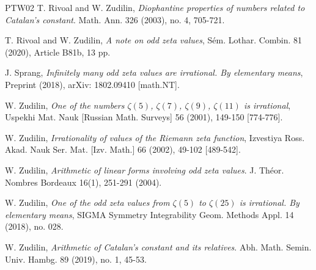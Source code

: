 \documentclass[11pt]{amsart}
\numberwithin{equation}{section}
\begin{document}
\begin{thebibliography}{PTW02}
 T. Rivoal and W. Zudilin, \textit{Diophantine properties of numbers related to Catalan's constant}.
Math. Ann. 326 (2003), no. 4, 705-721.

 T. Rivoal and W. Zudilin, \textit{A note on odd zeta values}, S{\'e}m. Lothar. Combin. 81 (2020), Article B81b, 13 pp.

 J. Sprang, \textit{Infinitely many odd zeta values are irrational. By elementary means}, Preprint (2018), arXiv: 1802.09410 [math.NT].

 W. Zudilin, \textit{One of the numbers $\zeta(5)$, $\zeta(7)$, $\zeta(9)$, $\zeta(11)$ is irrational}, Uspekhi Mat. Nauk [Russian Math. Surveys] 56 (2001), 149-150 [774-776].

 W. Zudilin, \textit{Irrationality of values of the Riemann zeta function}, Izvestiya Ross. Akad. Nauk
Ser. Mat. [Izv. Math.] 66 (2002), 49-102 [489-542].


 W. Zudilin, \textit{Arithmetic of linear forms involving odd zeta values}. J. Th{\'e}or. Nombres Bordeaux 16(1), 251-291 (2004).

  W. Zudilin, \textit{One of the odd zeta values from $\zeta(5)$ to $\zeta(25)$ is irrational. By elementary means}, SIGMA Symmetry Integrability Geom. Methods Appl. 14 (2018), no. 028.

 W. Zudilin, \textit{Arithmetic of Catalan's constant and its relatives}. Abh. Math. Semin. Univ. Hambg. 89 (2019), no. 1, 45-53.

\end{thebibliography}
\end{document}
